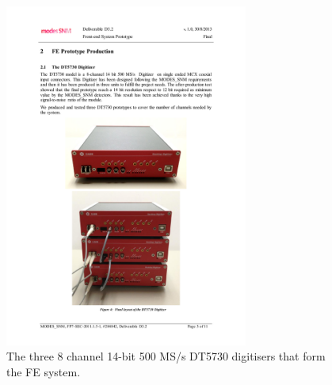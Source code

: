 \begin{figure}[htbp]
\begin{center}
\includegraphics[width=80mm]{Chapter5/figures/digitisers.pdf}
\caption{The three 8 channel 14-bit 500 MS/s DT5730 digitisers that form the FE system. }
\label{fig:modesDigitisers}
\end{center}
\end{figure}

